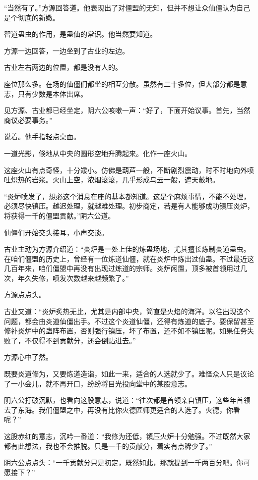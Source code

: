 \begin{this_body}
“当然有了。”方源回答道。他表现出了对僵盟的无知，但并不想让众仙僵认为自己是个彻底的新嫩。

智道蛊虫的作用，是蛊仙的常识。他当然要知道。

方源一边回答，一边坐到了古业的左边。

古业左右两边的位置，都是没有人的。

座位那么多。在场的仙僵们都坐的相互分散。虽然有二十多位，但大部分都是意志，只有少数是本体出席。

见方源、古业都已经坐定，阴六公咳嗽一声：“好了，下面开始议事。首先，当然商议必要事务。”

说着。他手指轻点桌面。

一道光影，倏地从中央的圆形空地升腾起来。化作一座火山。

这座火山有点奇怪，十分矮小。仿佛是葫芦一般，不断剧烈震动，时不时地向外喷吐炽热的岩浆。火山上空，浓烟滚滚，几乎形成乌云一般，遮天蔽地。

“炎炉喷发了，想必这个消息在座的基本都知道。这是个麻烦事情，不能不处理，必须尽快镇压。越迟处理，就越难处理。初步商定，若是有人能够成功镇压炎炉，将获得一千的僵盟贡献。”阴六公道。

仙僵们开始交头接耳，小声交谈。

古业主动为方源介绍道：“炎炉是一处上佳的炼蛊场地，尤其擅长炼制炎道蛊虫。在咱们僵盟的历史上，曾经有一位炼道仙僵，就在炎炉中炼出过仙蛊。不过最近这几百年来，咱们僵盟中再没有出现过炼道的宗师。炎炉闲置，顶多被首领用过几次，年久失修，喷发次数越来越频繁了。”

方源点点头。

古业又道：“炎炉炙热无比，尤其是内部中央，简直是火焰的海洋。以往出现这个问题，都会由炎道仙僵出手。不过这个炎道仙僵，还得有炼道的底子。要保留甚至修补炎炉中的蛊阵布置，否则强行镇压，坏了布置，还不如不镇压呢。如果任务失败了，不仅得不到贡献分，还会倒贴进去。”

方源心中了然。

既要炎道修为，又要炼道造诣，如此一来，适合的人选就少了。难怪众人只是议论了一小会儿，就不再开口，纷纷将目光投向堂中的某股意志。

阴六公打破沉默，也看向这股意志，说道：“往次都是首领亲自镇压，这些年首领去了东海。我们僵盟之中，再没有比你火德匠师更适合的人选了。火德，你看呢？”

这股赤红的意志，沉吟一番道：“我修为还低，镇压火炉十分勉强。不过既然大家都有此想法，我也不会推脱。只是一千的贡献分，着实有点稀少了。”

阴六公点点头：“一千贡献分只是初定，既然如此，那就提到一千两百分吧。你可愿接下？”


\end{this_body}
